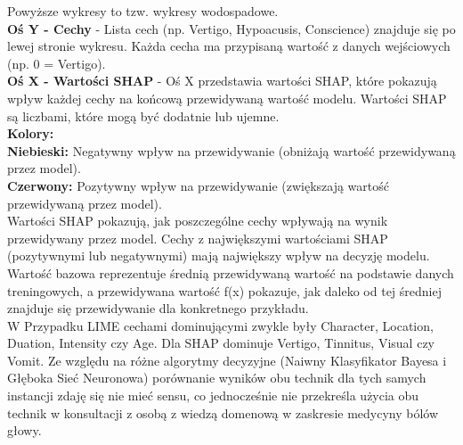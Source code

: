 Powyższe wykresy to tzw. wykresy wodospadowe.\\
\noindent\textbf{Oś Y - Cechy} - Lista cech (np. Vertigo, Hypoacusis, Conscience) znajduje się po lewej stronie wykresu. Każda cecha ma przypisaną wartość z danych wejściowych (np. 0 = Vertigo).\\
\noindent\textbf{Oś X - Wartości SHAP} - Oś X przedstawia wartości SHAP, które pokazują wpływ każdej cechy na końcową przewidywaną wartość modelu. Wartości SHAP są liczbami, które mogą być dodatnie lub ujemne.\\

\textbf{Kolory:}\\
\noindent\textbf{Niebieski:} Negatywny wpływ na przewidywanie (obniżają wartość przewidywaną przez model).\\
\noindent\textbf{Czerwony:} Pozytywny wpływ na przewidywanie (zwiększają wartość przewidywaną przez model).\\

Wartości SHAP pokazują, jak poszczególne cechy wpływają na wynik przewidywany przez model.
Cechy z największymi wartościami SHAP (pozytywnymi lub negatywnymi) mają największy wpływ na decyzję modelu.
Wartość bazowa reprezentuje średnią przewidywaną wartość na podstawie danych treningowych, a przewidywana wartość f(x) pokazuje, jak daleko od tej średniej znajduje się przewidywanie dla konkretnego przykładu.\\

W Przypadku LIME cechami dominującymi zwykle były Character, Location, Duation, Intensity czy Age. Dla SHAP dominuje Vertigo, Tinnitus, Visual czy Vomit. Ze względu na różne algorytmy decyzyjne (Naiwny Klasyfikator Bayesa i Głęboka Sieć Neuronowa) porównanie wyników obu technik dla tych samych instancji zdaję się nie mieć sensu, co jednocześnie nie przekreśla użycia obu technik w konsultacji z osobą z wiedzą domenową w zaskresie medycyny bólów głowy.